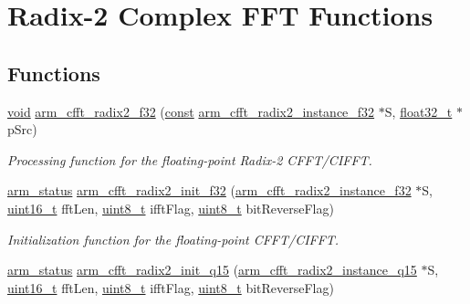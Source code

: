 \hypertarget{group___radix2___c_f_f_t___c_i_f_f_t}{\section{Radix-\/2 Complex F\-F\-T Functions}
\label{group___radix2___c_f_f_t___c_i_f_f_t}
}
\subsection*{Functions}
\begin{DoxyCompactItemize}
\item 
\hyperlink{group___n_a_m_e_ga18028b8badbf1ea7e704ccac3c488e82}{void} \hyperlink{group___radix2___c_f_f_t___c_i_f_f_t_ga9fadd650b802f612ae558ddaab789a6d}{arm\-\_\-cfft\-\_\-radix2\-\_\-f32} (\hyperlink{group___n_a_m_e_ga7ae6d0e43244213b34de2c2b9aa30da6}{const} \hyperlink{structarm__cfft__radix2__instance__f32}{arm\-\_\-cfft\-\_\-radix2\-\_\-instance\-\_\-f32} $\ast$S, \hyperlink{arm__math_8h_a4611b605e45ab401f02cab15c5e38715}{float32\-\_\-t} $\ast$p\-Src)
\begin{DoxyCompactList}\small\item\em Processing function for the floating-\/point Radix-\/2 C\-F\-F\-T/\-C\-I\-F\-F\-T. \end{DoxyCompactList}\item 
\hyperlink{arm__math_8h_a5e459c6409dfcd2927bb8a57491d7cf6}{arm\-\_\-status} \hyperlink{group___radix2___c_f_f_t___c_i_f_f_t_gac9565e6bc7229577ecf5e090313cafd7}{arm\-\_\-cfft\-\_\-radix2\-\_\-init\-\_\-f32} (\hyperlink{structarm__cfft__radix2__instance__f32}{arm\-\_\-cfft\-\_\-radix2\-\_\-instance\-\_\-f32} $\ast$S, \hyperlink{stdint_8h_a273cf69d639a59973b6019625df33e30}{uint16\-\_\-t} fft\-Len, \hyperlink{stdint_8h_aba7bc1797add20fe3efdf37ced1182c5}{uint8\-\_\-t} ifft\-Flag, \hyperlink{stdint_8h_aba7bc1797add20fe3efdf37ced1182c5}{uint8\-\_\-t} bit\-Reverse\-Flag)
\begin{DoxyCompactList}\small\item\em Initialization function for the floating-\/point C\-F\-F\-T/\-C\-I\-F\-F\-T. \end{DoxyCompactList}\item 
\hyperlink{arm__math_8h_a5e459c6409dfcd2927bb8a57491d7cf6}{arm\-\_\-status} \hyperlink{group___radix2___c_f_f_t___c_i_f_f_t_ga5c5b2127b3c4ea2d03692127f8543858}{arm\-\_\-cfft\-\_\-radix2\-\_\-init\-\_\-q15} (\hyperlink{structarm__cfft__radix2__instance__q15}{arm\-\_\-cfft\-\_\-radix2\-\_\-instance\-\_\-q15} $\ast$S, \hyperlink{stdint_8h_a273cf69d639a59973b6019625df33e30}{uint16\-\_\-t} fft\-Len, \hyperlink{stdint_8h_aba7bc1797add20fe3efdf37ced1182c5}{uint8\-\_\-t} ifft\-Flag, \hyperlink{stdint_8h_aba7bc1797add20fe3efdf37ced1182c5}{uint8\-\_\-t} bit\-Reverse\-Flag)

\end{DoxyCompactItemize}
